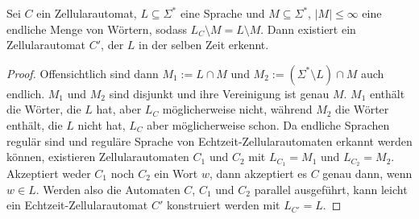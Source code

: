 \begin{satz}
    \label{endlichVieleAusnahmen}
    Sei $C$ ein Zellularautomat,
    $L \subseteq \Sigma^*$ eine Sprache und $M \subseteq \Sigma^*$, $|M| \leq \infty$  eine endliche Menge von Wörtern, sodass $L_C \setminus M = L \setminus M$.
    Dann existiert ein Zellularautomat $C'$, der $L$ in der selben Zeit erkennt.
\end{satz}
\begin{proof}
    Offensichtlich sind dann $M_1 := L \cap M$ und $M_2 := (\Sigma^* \setminus L) \cap M$ auch endlich.
    $M_1$ und $M_2$ sind disjunkt und ihre Vereinigung ist genau $M$.
    $M_1$ enthält die Wörter, die $L$ hat, aber $L_C$ möglicherweise nicht, während $M_2$ die Wörter enthält, die $L$ nicht hat, $L_C$ aber möglicherweise schon.
    Da endliche Sprachen regulär sind und reguläre Sprache von Echtzeit-Zellularautomaten erkannt werden können,
    existieren Zellularautomaten $C_1$ und $C_2$ mit $L_{C_1} = M_1$ und $L_{C_2} = M_2$.
    Akzeptiert weder $C_1$ noch $C_2$ ein Wort $w$, dann akzeptiert es $C$ genau dann, wenn $w \in L$.
    Werden also die Automaten $C$, $C_1$ und $C_2$ parallel ausgeführt, kann leicht ein Echtzeit-Zellularautomat $C'$ konstruiert werden mit $L_{C'} = L$.
\end{proof}